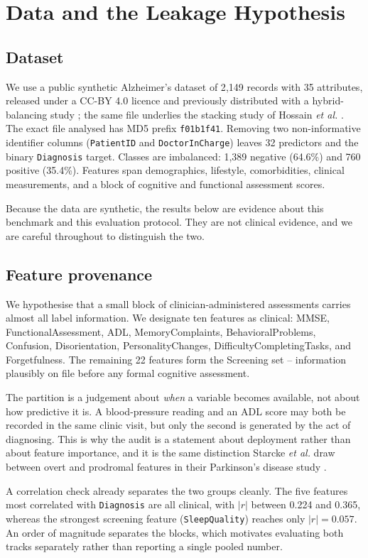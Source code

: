 \documentclass[conference]{IEEEtran}
\begin{document}
\section{Data and the Leakage Hypothesis}
\label{sec:leakage-hyp}
\subsection{Dataset}
We use a public synthetic Alzheimer's dataset of 2{,}149 records with 35 attributes, released under a CC-BY 4.0 licence and previously distributed with a hybrid-balancing study \cite{b13,b14}; the same file underlies the stacking study of Hossain \textit{et al.} \cite{b37}. The exact file analysed has MD5 prefix \texttt{f01b1f41}. Removing two non-informative identifier columns (\texttt{PatientID} and \texttt{DoctorInCharge}) leaves 32 predictors and the binary \texttt{Diagnosis} target. Classes are imbalanced: 1{,}389 negative (64.6\%) and 760 positive (35.4\%). Features span demographics, lifestyle, comorbidities, clinical measurements, and a block of cognitive and functional assessment scores.

Because the data are synthetic, the results below are evidence about this benchmark and this evaluation protocol. They are not clinical evidence, and we are careful throughout to distinguish the two.

\subsection{Feature provenance}
We hypothesise that a small block of clinician-administered assessments carries almost all label information. We designate ten features as clinical: MMSE, FunctionalAssessment, ADL, MemoryComplaints, BehavioralProblems, Confusion, Disorientation, PersonalityChanges, DifficultyCompletingTasks, and Forgetfulness. The remaining 22 features form the Screening set -- information plausibly on file before any formal cognitive assessment.

The partition is a judgement about \emph{when} a variable becomes available, not about how predictive it is. A blood-pressure reading and an ADL score may both be recorded in the same clinic visit, but only the second is generated by the act of diagnosing. This is why the audit is a statement about deployment rather than about feature importance, and it is the same distinction Starcke \textit{et al.} draw between overt and prodromal features in their Parkinson's disease study \cite{b42}.

A correlation check already separates the two groups cleanly. The five features most correlated with \texttt{Diagnosis} are all clinical, with $|r|$ between 0.224 and 0.365, whereas the strongest screening feature (\texttt{SleepQuality}) reaches only $|r| = 0.057$. An order of magnitude separates the blocks, which motivates evaluating both tracks separately rather than reporting a single pooled number.
\end{document}
